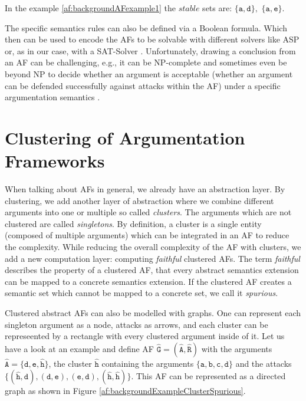  In the example \ref{af:backgroundAFexample1} the $stable$ sets are:
$\mathtt{\{a, d\}},$
$\mathtt{\{a, e\}}$.

\vspace{0.5cm}
\noindent
The specific semantics rules can also be defined via a Boolean formula. Which then can be used to encode the AFs to be solvable with different solvers like \ac{ASP} \cite{DBLP:journals/corr/abs-1301-1388} or, as in our case, with a \ac{SAT-Solver} \cite{DBLP:journals/amai/AmgoudD13}. Unfortunately, drawing a conclusion from an AF can be challenging, e.g., it can be NP-complete and sometimes even be beyond NP to decide whether an argument is acceptable (whether an argument can be defended successfully against attacks within the AF) under a specific argumentation semantics \cite{DBLP:journals/ai/DvorakGRW23}.



\section{Clustering of Argumentation Frameworks}
\label{sec:ClusteringOfArgumentationFrameworks}

When talking about AFs in general, we already have an abstraction layer. By clustering, we add another layer of abstraction where we combine different arguments into one or multiple so called \textit{clusters}. The arguments which are not clustered are called \textit{singletons}.
By definition, a cluster is a single entity (composed of multiple arguments) which can be integrated in an AF to reduce the complexity. While reducing the overall complexity of the AF with clusters, we add a new computation layer: computing \textit{faithful} clustered AFs. The term \textit{faithful} describes the property of a clustered AF, that every abstract semantics extension can be mapped to a concrete semantics extension. If the clustered AF creates a semantic set which cannot be mapped to a concrete set, we call it \textit{spurious}.

Clustered abstract AFs can also be modelled with graphs. One can represent each singleton argument as a node, attacks as arrows, and each cluster can be represeented by a rectangle with every clustered argument inside of it. Let us have a look at an example and define AF $\mathtt{\hat{G}=(\hat{A}, \hat{R})}$ with the arguments $\mathtt{\hat{A}=\{d, e, \hat{h}\}}$, the cluster $\mathtt{\hat{h}}$ containing the arguments $\mathtt{\{a, b, c, d\}}$ and the attacks $\mathtt{\{(\hat{h}, d), (d, e), (e, d), (\hat{h}, \hat{h})\}}$.  This AF can be represented as a directed graph as shown in Figure \ref{af:backgroundExampleClusterSpurious}.



